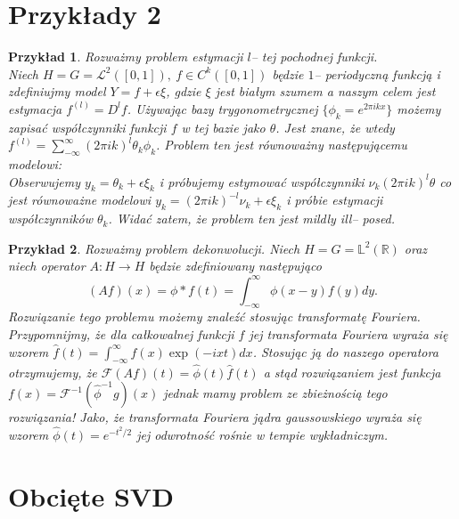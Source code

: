 \documentclass[12pt]{article}
\newtheorem{prz}{Przykład}
\begin{document}
\section{Przykłady 2}
\begin{prz}
Rozważmy problem estymacji $l$-- tej pochodnej funkcji.\\
Niech $H=G=\mathcal{L}^2([0,1]),\ f\in C^k([0,1])$ będzie $1$-- periodyczną funkcją i zdefiniujmy model $Y=f+\epsilon\xi$, gdzie $\xi$ jest białym szumem a naszym celem jest estymacja $f^{(l)}=D^lf$. Używając bazy trygonometrycznej $\{\phi_k=e^{2\pi i k x}\}$ możemy zapisać współczynniki funkcji $ f$ w tej bazie jako $\theta$. Jest znane, że wtedy $f^{(l)}=\sum_{-\infty}^{\infty}(2\pi i k)^l\theta_k \phi_k$. Problem ten jest równoważny następującemu modelowi:\\
Obserwujemy $y_k=\theta_k+\epsilon\xi_k$ i próbujemy estymować współczynniki $\nu_k(2\pi i k)^l\theta$ co jest równoważne modelowi $y_k=(2\pi i k)^{-l}\nu_k+\epsilon\xi_k$ i próbie estymacji współczynników $\theta_k$. Widać zatem, że problem ten jest mildly ill-- posed.
\end{prz}
\begin{prz}
Rozważmy problem dekonwolucji. Niech $H=G=\mathbb{L}^2(\mathbb{R})$ oraz niech operator $A\colon H\to H$ będzie zdefiniowany następująco
\begin{displaymath}
(Af)(x)=\phi \ast f(t)=\int_{-\infty}^{\infty}\phi (x-y)f(y)dy.
\end{displaymath} 
Rozwiązanie tego problemu możemy znaleźć stosując transformatę Fouriera. Przypomnijmy, że dla całkowalnej funkcji $f$ jej transformata Fouriera wyraża się wzorem $\hat{f}(t)=\int_{-\infty}^{\infty}f(x)\exp{(- i xt)}dx$. Stosując ją do naszego operatora otrzymujemy, że $\mathcal{F}(Af)(t)=\hat{\phi}(t)\hat{f}(t)$ a stąd rozwiązaniem jest funkcja $f(x)=\mathcal{F}^{-1}(\hat{\phi}^{-1}g)(x)$ jednak mamy problem ze zbieżnością tego rozwiązania! Jako, że transformata Fouriera jądra gaussowskiego wyraża się wzorem $\hat{\phi}(t)=e^{-t^2/2}$ jej odwrotność rośnie w tempie wykładniczym.
\end{prz}

\section{Obcięte SVD}
\end{document}
